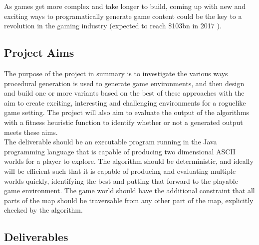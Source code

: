 \documentclass[12pt,a4paper]{article}
\begin{document}
As games get more complex and take longer to build, coming up with new and exciting ways to programatically generate game content could be the key to a revolution in the gaming industry (expected to reach \$103bn in 2017 \cite{newzoo}).







\subsection{Project Aims}

The purpose of the project in summary is to investigate the various ways procedural generation is used to generate game environments, and then design and build one or more variants based on the best of these approaches with the aim to create exciting, interesting and challenging environments for a roguelike game setting. The project will also aim to evaluate the output of the algorithms with a fitness heuristic function to identify whether or not a generated output meets these aims. \\

The deliverable should be an executable program running in the Java programming language that is capable of producing two dimensional ASCII worlds for a player to explore. The algorithm should be deterministic, and ideally will be efficient such that it is capable of producing and evaluating multiple worlds quickly, identifying the best and putting that forward to the playable game environment. The game world should have the additional constraint that all parts of the map should be traversable from any other part of the map, explicitly checked by the algorithm. 




\subsection{Deliverables}
\end{document}
